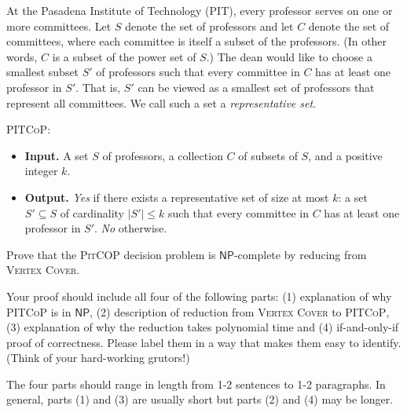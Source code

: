 \documentclass[12 pt, letterpaper]{hmcpset}
\newcommand{\NP}{$\mathsf{NP}$}
\begin{document}
\begin{problem}
	At the Pasadena Institute of Technology (PIT), every professor serves on one or more committees. Let $S$ denote the set of professors and let $C$ denote the set of committees, where each committee is itself a subset of the professors. (In other words, $C$ is a subset of the power set of $S$.) The dean would like to choose a smallest subset $S'$ of professors such that every committee in $C$ has at least one professor in $S'$.  That is, $S'$ can be viewed as a smallest set of professors that represent all committees.  We call such a set a \emph{representative set}.  

\textsc{PITCoP}:
\begin{itemize}
    \item \textbf{Input. } A set $S$ of professors, a collection $C$ of subsets of $S$, and a positive integer $k$.
    \item \textbf{Output. } \emph{Yes} if there exists a representative set of size at most $k$: a set $S' \subseteq S$ of cardinality $|S'| \leq k$ such that every committee in $C$ has at least one professor in $S'$. \emph{No} otherwise.
\end{itemize}

Prove that the \textsc{PitCOP} decision problem is \NP-complete by reducing from \textsc{Vertex Cover}.  

Your proof should include all four of the following parts: (1) explanation of why \textsc{PITCoP} is in \NP, (2) description of reduction from \textsc{Vertex Cover} to \textsc{PITCoP}, (3) explanation of why the reduction takes polynomial time and (4) if-and-only-if proof of correctness. Please label them in a way that makes them easy to identify. (Think of your hard-working grutors!) 

The four parts should range in length from 1-2 sentences to 1-2 paragraphs. In general, parts (1) and (3) are usually short but parts (2) and (4) may be longer.
\end{problem}
\end{document}
